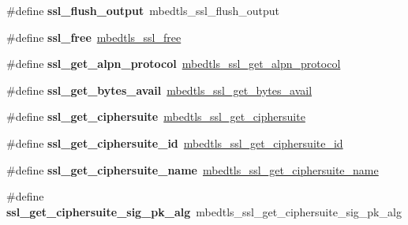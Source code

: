 \begin{DoxyCompactItemize}
\item 
\mbox{\label{compat-1_83_8h_afdd6a3a31ebccc7d0fb6c4088312b150}} 
\#define {\bfseries ssl\+\_\+flush\+\_\+output}~mbedtls\+\_\+ssl\+\_\+flush\+\_\+output
\item 
\mbox{\label{compat-1_83_8h_a92c8065e8d5424e953c6604a83f76385}} 
\#define {\bfseries ssl\+\_\+free}~\mbox{\hyperlink{ssl_8h_a2dc104a181bcd11eafbbf7e6923978bc}{mbedtls\+\_\+ssl\+\_\+free}}
\item 
\mbox{\label{compat-1_83_8h_a04dcb33243e3857e8459044556da2dfa}} 
\#define {\bfseries ssl\+\_\+get\+\_\+alpn\+\_\+protocol}~\mbox{\hyperlink{ssl_8h_ad1ab606db1a9307b4aacccdcd1d1a6ef}{mbedtls\+\_\+ssl\+\_\+get\+\_\+alpn\+\_\+protocol}}
\item 
\mbox{\label{compat-1_83_8h_ad43aaf6581b9762546cdf75c8b2370b1}} 
\#define {\bfseries ssl\+\_\+get\+\_\+bytes\+\_\+avail}~\mbox{\hyperlink{ssl_8h_ad43142085f3182e9b0dc967ec582032b}{mbedtls\+\_\+ssl\+\_\+get\+\_\+bytes\+\_\+avail}}
\item 
\mbox{\label{compat-1_83_8h_a9116daf1f31763fbf6f19debecd5b2cc}} 
\#define {\bfseries ssl\+\_\+get\+\_\+ciphersuite}~\mbox{\hyperlink{ssl_8h_a18739598df499461369020b8ea6fff1c}{mbedtls\+\_\+ssl\+\_\+get\+\_\+ciphersuite}}
\item 
\mbox{\label{compat-1_83_8h_a553b7c0ab616f647cb2da1843daf46b2}} 
\#define {\bfseries ssl\+\_\+get\+\_\+ciphersuite\+\_\+id}~\mbox{\hyperlink{ssl_8h_a9914cdf5533e813e1ea7ca52981aa006}{mbedtls\+\_\+ssl\+\_\+get\+\_\+ciphersuite\+\_\+id}}
\item 
\mbox{\label{compat-1_83_8h_afaa02c1f2a377fcd218bf3254ca8158e}} 
\#define {\bfseries ssl\+\_\+get\+\_\+ciphersuite\+\_\+name}~\mbox{\hyperlink{ssl_8h_ada9a0169e4712521049117d29b91e1e5}{mbedtls\+\_\+ssl\+\_\+get\+\_\+ciphersuite\+\_\+name}}
\item 
\mbox{\label{compat-1_83_8h_ab2eee60456eba9b5c1da2a6b6fbee1e2}} 
\#define {\bfseries ssl\+\_\+get\+\_\+ciphersuite\+\_\+sig\+\_\+pk\+\_\+alg}~mbedtls\+\_\+ssl\+\_\+get\+\_\+ciphersuite\+\_\+sig\+\_\+pk\+\_\+alg
\item 

\end{DoxyCompactItemize}
